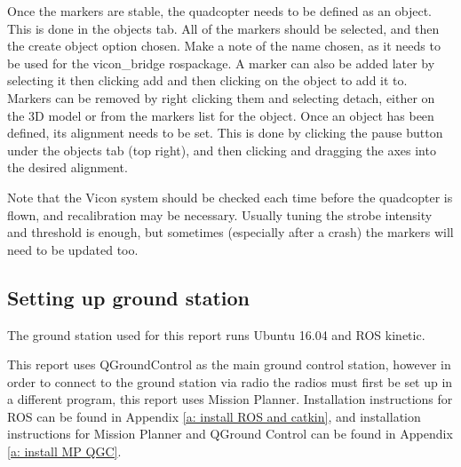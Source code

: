 \documentclass[12pt,a4paper]{article}
\begin{document}
    Once the markers are stable, the quadcopter needs to be defined as an object. This is done in the objects tab. All of the markers should be selected, and then the create object option chosen. Make a note of the name chosen, as it needs to be used for the vicon\_bridge rospackage. A marker can also be added later by selecting it then clicking add and then clicking on the object to add it to. Markers can be removed by right clicking them and selecting detach, either on the 3D model or from the markers list for the object. Once an object has been defined, its alignment needs to be set. This is done by clicking the pause button under the objects tab (top right), and then clicking and dragging the axes into the desired alignment.
     
    Note that the Vicon system should be checked each time before the quadcopter is flown, and recalibration may be necessary. Usually tuning the strobe intensity and threshold is enough, but sometimes (especially after a crash) the markers will need to be updated too.


  \subsection{Setting up ground station}
    \label{a: computer}
    The ground station used for this report runs Ubuntu 16.04 and ROS kinetic.
     
    This report uses QGroundControl as the main ground control station, however in order to connect to the ground station via radio the radios must first be set up in a different program, this report uses Mission Planner. Installation instructions for ROS can be found in Appendix \ref{a: install ROS and catkin}, and installation instructions for Mission Planner and QGround Control can be found in Appendix \ref{a: install MP QGC}.
\end{document}

